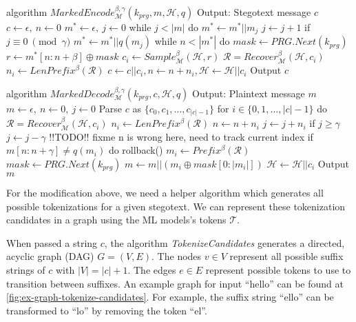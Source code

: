 \begin{Pseudocode}[float, caption={Marked Encode Algorithm}, label={alg:marked-encode}]
algorithm $MarkedEncode_{\mathcal{M}}^{\beta, \gamma}(k_{prg}, m, \mathcal{H}, q)$
	Output: Stegotext message $c$
	$c \leftarrow \epsilon,~ n \leftarrow 0$
	$m^* \leftarrow \epsilon,~ j \leftarrow 0$
	while $j < |m|$ do
		$m^* \leftarrow m^* || m_j$
		$j \leftarrow j + 1$
		if $j \equiv 0~ \pmod \gamma$
			$m^* \leftarrow m^* || q(m_j)$
	while $n < |m^*|$ do
		$mask \leftarrow PRG.Next(k_{prg})$
		$r \leftarrow m^*[n:n+\beta] \oplus mask$
		$c_i \leftarrow Sample_{\mathcal{M}}^\beta(\mathcal{H}, r)$
		$\mathcal{R} = Recover_{\mathcal{M}}^\beta(\mathcal{H}, c_i)$
		$n_i \leftarrow LenPrefix^\beta(\mathcal{R})$
		$c \leftarrow c || c_i, n \leftarrow n+n_i, \mathcal{H} \leftarrow \mathcal{H}||c_i$
	Output $c$
\end{Pseudocode}



\begin{Pseudocode}[float, caption={Marked Decode Algorithm}, label={alg:marked-decode}]
algorithm $MarkedDecode_{\mathcal{M}}^{\beta,\gamma}(k_{prg}, c, \mathcal{H}, q)$
	Output: Plaintext message $m$
	$m \leftarrow \epsilon,~ n \leftarrow 0,~ j \leftarrow 0$
	Parse $c$ as $\{ c_0, c_1, \dots, c_{|c|-1} \}$
	for $i \in \{0, 1, \dots, |c|-1 \}$ do
		$\mathcal{R} = Recover_{\mathcal{M}}^\beta(\mathcal{H}, c_i)$
		$n_i \leftarrow LenPrefix^\beta(\mathcal{R})$
		$n \leftarrow n + n_i$
		$j \leftarrow j + n_i$
		if $j \geq \gamma$
			$j \leftarrow j - \gamma$
			!!TODO!! fixme n is wrong here, need to track current index
			if $m[n:n+\gamma] \neq q(m_i)$ do
				rollback()
		$m_i \leftarrow Prefix^\beta(\mathcal{R})$
		$mask \leftarrow PRG.Next(k_{prg})$
		$m \leftarrow m || (m_i \oplus mask[0: |m_i|])$
		$\mathcal{H} \leftarrow \mathcal{H}||c_i$
	Output $m$
\end{Pseudocode}

For the modification above, we need a helper algorithm which generates all possible tokenizations for a given stegotext.
We can represent these tokenization candidates in a graph using the ML models's tokens $\mathcal{T}$.

When passed a string $c$, the algorithm \emph{TokenizeCandidates} generates a directed, acyclic graph (DAG) $G = (V, E)$.
The nodes $v \in V$ represent all possible suffix strings of $c$ with $|V| = |c| + 1$.
The edges $e \in E$ represent possible tokens to use to transition between suffixes.
An example graph for input ``hello'' can be found at \ref{fig:ex-graph-tokenize-candidates}.
For example, the suffix string ``ello'' can be transformed to ``lo'' by removing the token ``el''.

